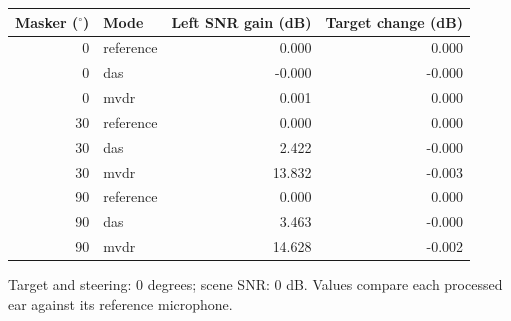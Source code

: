 \begin{center}\small\begin{tabular}{@{}rlrr@{}}\toprule Masker ($^\circ$) & Mode & Left SNR gain (dB) & Target change (dB)\\\midrule
0 & reference & 0.000 & 0.000 \\
0 & das & -0.000 & -0.000 \\
0 & mvdr & 0.001 & 0.000 \\
30 & reference & 0.000 & 0.000 \\
30 & das & 2.422 & -0.000 \\
30 & mvdr & 13.832 & -0.003 \\
90 & reference & 0.000 & 0.000 \\
90 & das & 3.463 & -0.000 \\
90 & mvdr & 14.628 & -0.002 \\\bottomrule\end{tabular}\end{center}
Target and steering: 0 degrees; scene SNR: 0 dB. Values compare each processed ear against its reference microphone.
